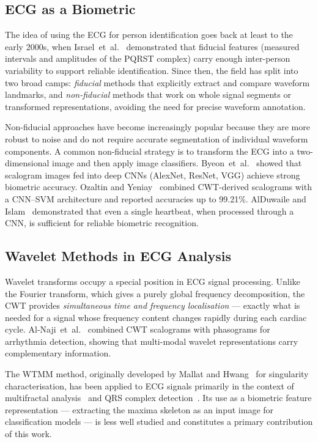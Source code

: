 \documentclass[12pt, a4paper]{article}
\begin{document}
\subsection{ECG as a Biometric}

The idea of using the ECG for person identification goes back at least to the
early 2000s, when Israel~et~al.~\cite{israel2005} demonstrated that fiducial
features (measured intervals and amplitudes of the PQRST complex) carry
enough inter-person variability to support reliable identification.
Since then, the field has split into two broad camps: \textit{fiducial}
methods that explicitly extract and compare waveform landmarks, and
\textit{non-fiducial} methods that work on whole signal segments or
transformed representations, avoiding the need for precise waveform
annotation.

Non-fiducial approaches have become increasingly popular because they are
more robust to noise and do not require accurate segmentation of individual
waveform components. A common non-fiducial strategy is to transform the ECG
into a two-dimensional image and then apply image classifiers.
Byeon~et~al.~\cite{byeon2019} showed that scalogram images fed into
deep CNNs (AlexNet, ResNet, VGG) achieve strong biometric accuracy.
Ozaltin and Yeniay~\cite{ozaltin2023} combined CWT-derived scalograms with
a CNN--SVM architecture and reported accuracies up to 99.21\%.
AlDuwaile and Islam~\cite{alduwaile2021} demonstrated that even a single
heartbeat, when processed through a CNN, is sufficient for reliable
biometric recognition.

\subsection{Wavelet Methods in ECG Analysis}

Wavelet transforms occupy a special position in ECG signal processing.
Unlike the Fourier transform, which gives a purely global frequency
decomposition, the CWT provides \textit{simultaneous time and frequency
localisation} --- exactly what is needed for a signal whose frequency
content changes rapidly during each cardiac cycle.
Al-Naji~et~al.~\cite{alnaji2024} combined CWT scalograms with phasograms
for arrhythmia detection, showing that multi-modal wavelet representations
carry complementary information.

The WTMM method, originally developed by Mallat and Hwang~\cite{mallat1992}
for singularity characterisation, has been applied to ECG signals primarily
in the context of multifractal analysis~\cite{ivanov1999} and QRS complex
detection~\cite{li1995}. Its use as a biometric feature representation ---
extracting the maxima skeleton as an input image for classification models
--- is less well studied and constitutes a primary contribution of
this work.
\end{document}
